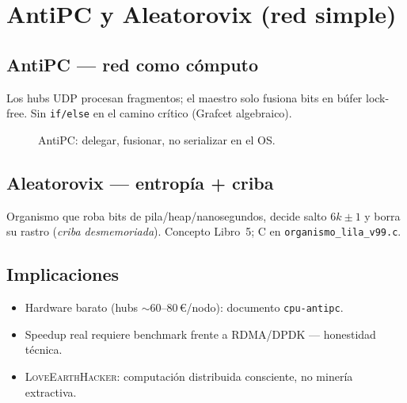 \documentclass[11pt,a4paper,twoside]{book}
\newcommand{\LoveEarthHacker}{\textsc{LoveEarthHacker}}
\begin{document}
\chapter{AntiPC y Aleatorovix (red simple)}

\section{AntiPC — red como cómputo}
Los hubs UDP procesan fragmentos; el maestro solo fusiona bits en búfer
lock-free. Sin \texttt{if/else} en el camino crítico (Grafcet algebraico).

\begin{figure}[htbp]
\centering
{}
\caption{AntiPC: delegar, fusionar, no serializar en el OS.}
\end{figure}

\section{Aleatorovix — entropía + criba}
Organismo que roba bits de pila/heap/nanosegundos, decide salto $6k\pm1$
y borra su rastro (\emph{criba desmemoriada}). Concepto Libro~5; C en
\texttt{organismo\_lila\_v99.c}.

\section{Implicaciones}
\begin{itemize}[noitemsep]
  \item Hardware barato (hubs $\sim$60--80\,€/nodo): documento \texttt{cpu-antipc}.
  \item Speedup real requiere benchmark frente a RDMA/DPDK --- honestidad técnica.
  \item \LoveEarthHacker: computación distribuida consciente, no minería extractiva.
\end{itemize}
\end{document}
